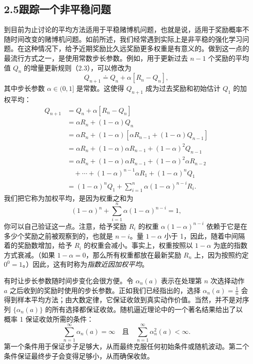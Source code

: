 \documentclass[UTF8,12pt,a4paper,fontset=fandol]{ctexart}
\begin{document}
\subsection*{2.5\quad 跟踪一个非平稳问题}

到目前为止讨论的平均方法适用于平稳赌博机问题，也就是说，适用于奖励概率不随时间改变的赌博机问题。如前所述，我们经常遇到实际上是非平稳的强化学习问题。在这种情况下，给予近期奖励比久远奖励更多权重是有意义的。做到这一点的最流行方式之一，是使用常数步长参数。例如，用于更新过去 $n-1$ 个奖励的平均值 $Q_n$ 的增量更新规则（2.3），可以修改为
\begin{equation}
Q_{n+1}\doteq Q_n+\alpha\left[R_n-Q_n\right],
\tag{2.5}
\end{equation}
其中步长参数 $\alpha\in(0,1]$ 是常数。这使得 $Q_{n+1}$ 成为过去奖励和初始估计 $Q_1$ 的加权平均：
\begin{equation}
\begin{aligned}
Q_{n+1}
&= Q_n+\alpha\left[R_n-Q_n\right]\\
&= \alpha R_n+(1-\alpha)Q_n\\
&= \alpha R_n+(1-\alpha)\left[\alpha R_{n-1}+(1-\alpha)Q_{n-1}\right]\\
&= \alpha R_n+(1-\alpha)\alpha R_{n-1}+(1-\alpha)^2Q_{n-1}\\
&= \alpha R_n+(1-\alpha)\alpha R_{n-1}+(1-\alpha)^2\alpha R_{n-2}\\
&\quad+\cdots+(1-\alpha)^{n-1}\alpha R_1+(1-\alpha)^nQ_1\\
&= (1-\alpha)^nQ_1+\sum_{i=1}^{n}\alpha(1-\alpha)^{n-i}R_i.
\end{aligned}
\tag{2.6}
\end{equation}
我们把它称为加权平均，是因为权重之和为
\[
(1-\alpha)^n+\sum_{i=1}^{n}\alpha(1-\alpha)^{n-i}=1,
\]
你可以自己验证这一点。注意，给予奖励 $R_i$ 的权重 $\alpha(1-\alpha)^{n-i}$ 依赖于它是在多少个奖励之前被观察到的，也就是 $n-i$。量 $1-\alpha$ 小于 1，因此，随着中间隔着的奖励数增加，给予 $R_i$ 的权重会减小。事实上，权重按照以 $1-\alpha$ 为底的指数方式衰减。（如果 $1-\alpha=0$，那么所有权重都放在最新奖励 $R_n$ 上，因为按照约定 $0^0=1$。）因此，这有时称为\textit{指数近因加权平均}。

有时让步长参数随时间步变化会很方便。令 $\alpha_n(a)$ 表示在处理第 $n$ 次选择动作 $a$ 之后收到的奖励时使用的步长参数。正如我们已经指出的，选择 $\alpha_n(a)=\frac{1}{n}$ 会得到样本平均方法；由大数定律，它保证收敛到真实动作价值。当然，并不是对序列 $\{\alpha_n(a)\}$ 的所有选择都保证收敛。随机逼近理论中的一个著名结果给出了以概率 1 保证收敛所需的条件：
\begin{equation}
\sum_{n=1}^{\infty}\alpha_n(a)=\infty
\quad\text{且}\quad
\sum_{n=1}^{\infty}\alpha_n^2(a)<\infty.
\tag{2.7}
\end{equation}
第一个条件用于保证步子足够大，从而最终克服任何初始条件或随机波动。第二个条件保证最终步子会变得足够小，从而确保收敛。
\end{document}
